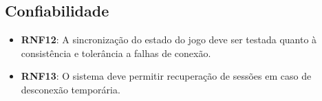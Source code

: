 \subsection{Confiabilidade}
\begin{itemize}
    \item \textbf{RNF12}: A sincronização do estado do jogo deve ser testada quanto à consistência e tolerância a falhas de conexão.
    \item \textbf{RNF13}: O sistema deve permitir recuperação de sessões em caso de desconexão temporária.
\end{itemize}
